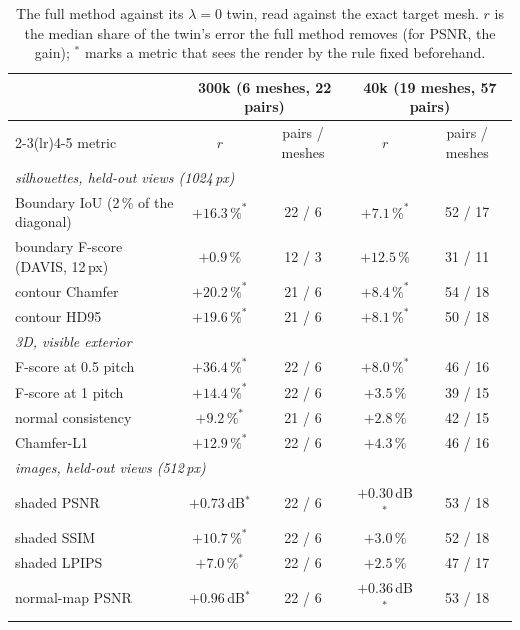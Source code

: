 \begin{table}[t]
\centering
\footnotesize
\setlength{\tabcolsep}{4pt}
\caption{The full method against its $\lambda=0$ twin, read against the exact target mesh. \textmd{$r$ is the median share
of the twin's error the full method removes (for PSNR, the gain); $^\ast$ marks a metric that sees the render by the rule
fixed beforehand.}}
\label{ch4:tab_d157}
\begin{tabular}{lcccc}
\toprule
 & \multicolumn{2}{c}{300k (6 meshes, 22 pairs)} & \multicolumn{2}{c}{40k (19 meshes, 57 pairs)} \\
\cmidrule(lr){2-3}\cmidrule(lr){4-5}
metric & $r$ & pairs / meshes & $r$ & pairs / meshes \\
\midrule
\multicolumn{5}{l}{\textit{silhouettes, held-out views (1024\,px)}}\\
Boundary IoU (2\,\% of the diagonal) & $+16.3\,\%^\ast$ & 22 / 6 & $+7.1\,\%^\ast$ & 52 / 17 \\
boundary F-score (DAVIS, 12\,px)      & $+0.9\,\%$       & 12 / 3 & $+12.5\,\%$      & 31 / 11 \\
contour Chamfer                       & $+20.2\,\%^\ast$ & 21 / 6 & $+8.4\,\%^\ast$  & 54 / 18 \\
contour HD95                          & $+19.6\,\%^\ast$ & 21 / 6 & $+8.1\,\%^\ast$  & 50 / 18 \\
\multicolumn{5}{l}{\textit{3D, visible exterior}}\\
F-score at 0.5 pitch                  & $+36.4\,\%^\ast$ & 22 / 6 & $+8.0\,\%^\ast$  & 46 / 16 \\
F-score at 1 pitch                    & $+14.4\,\%^\ast$ & 22 / 6 & $+3.5\,\%$       & 39 / 15 \\
normal consistency                    & $+9.2\,\%^\ast$  & 21 / 6 & $+2.8\,\%$       & 42 / 15 \\
Chamfer-L1                            & $+12.9\,\%^\ast$ & 22 / 6 & $+4.3\,\%$       & 46 / 16 \\
\multicolumn{5}{l}{\textit{images, held-out views (512\,px)}}\\
shaded PSNR                           & $+0.73$\,dB$^\ast$ & 22 / 6 & $+0.30$\,dB$^\ast$ & 53 / 18 \\
shaded SSIM                           & $+10.7\,\%^\ast$ & 22 / 6 & $+3.0\,\%$       & 52 / 18 \\
shaded LPIPS                          & $+7.0\,\%^\ast$  & 22 / 6 & $+2.5\,\%$       & 47 / 17 \\
normal-map PSNR                       & $+0.96$\,dB$^\ast$ & 22 / 6 & $+0.36$\,dB$^\ast$ & 53 / 18 \\

\end{tabular}
\end{table}
